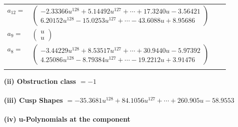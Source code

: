 \documentclass[1p]{elsarticle_modified}
\theoremstyle{definition}
\begin{document}
\begin{tabular}{m{7pt} m{180pt} m{7pt} m{180pt} }
\flushright $a_{12}=$&$\begin{pmatrix}-2.33366 u^{128}+5.14492 u^{127}+\cdots+17.3240 u-3.56421\\6.20152 u^{128}-15.0253 u^{127}+\cdots-43.6088 u+8.95686\end{pmatrix}$ \\
\flushright $a_{9}=$&$\begin{pmatrix}u\\u\end{pmatrix}$ \\
\flushright $a_{8}=$&$\begin{pmatrix}-3.44229 u^{128}+8.53517 u^{127}+\cdots+30.9440 u-5.97392\\4.25086 u^{128}-8.79384 u^{127}+\cdots-19.2212 u+3.91476\end{pmatrix}$\\&\end{tabular}
\flushleft \textbf{(ii) Obstruction class $= -1$}\\~\\
\flushleft \textbf{(iii) Cusp Shapes $= -35.3681 u^{128}+84.1056 u^{127}+\cdots+260.905 u-58.9553$}\\~\\
\newpage\renewcommand{\arraystretch}{1}
\flushleft \textbf{(iv) u-Polynomials at the component}\newline \\
\end{document}
